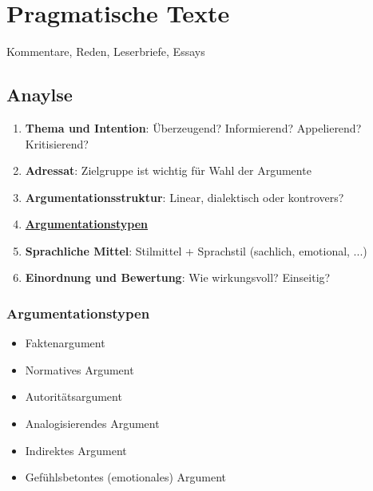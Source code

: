 
\section{Pragmatische Texte}

 Kommentare, Reden, Leserbriefe, Essays

\subsection{Anaylse}

\begin{enumerate}
    \item \textbf{Thema und Intention}: Überzeugend? Informierend? Appelierend? Kritisierend?
    \item \textbf{Adressat}: Zielgruppe ist wichtig für Wahl der Argumente
    \item \textbf{Argumentationsstruktur}: Linear, dialektisch oder kontrovers?
    \item \textbf{\hyperref[sec:argumentationstypen]{Argumentationstypen}}
    \item \textbf{Sprachliche Mittel}: Stilmittel + Sprachstil (sachlich, emotional, ...)
    \item \textbf{Einordnung und Bewertung}: Wie wirkungsvoll? Einseitig? 
\end{enumerate}


\subsubsection{Argumentationstypen}
\label{sec:argumentationstypen}
\begin{itemize}
    \item Faktenargument
    \item Normatives Argument
    \item Autoritätsargument
    \item Analogisierendes Argument
    \item Indirektes Argument
    \item Gefühlsbetontes (emotionales) Argument
\end{itemize}
